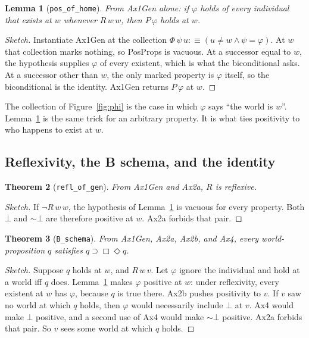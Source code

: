 \documentclass[11pt,a4paper]{article}
\newcommand{\Nec}{\Box}
\newcommand{\Pos}{\Diamond}
\newcommand{\lean}[1]{\texttt{#1}}
\newtheorem{theorem}{Theorem}
\newtheorem{lemma}[theorem]{Lemma}
\theoremstyle{definition}
\theoremstyle{remark}
\begin{document}
\begin{lemma}[\lean{pos\_of\_home}]
\label{lem:home}
From Ax1Gen alone: if \(\varphi\) holds of every individual that exists at
\(w\) whenever \(R\,w\,w\), then \(P\,\varphi\) holds at \(w\).
\end{lemma}

\begin{proof}[Sketch]
Instantiate Ax1Gen at the collection \(\Phi\,\psi\,u :\equiv (u \neq w \land \psi = \varphi)\).
At \(w\) that collection marks nothing, so PosProps is vacuous.
At a successor equal to \(w\), the hypothesis supplies \(\varphi\) of every
existent, which is what the biconditional asks.
At a successor other than \(w\), the only marked property is \(\varphi\) itself,
so the biconditional is the identity.
Ax1Gen returns \(P\,\varphi\) at \(w\).
\end{proof}

The collection of Figure~\ref{fig:phi} is the case in which \(\varphi\) says
``the world is \(w\)''.
Lemma~\ref{lem:home} is the same trick for an arbitrary property.
It is what ties positivity to who happens to exist at \(w\).

\subsection{Reflexivity, the B schema, and the identity}

\begin{theorem}[\lean{refl\_of\_gen}]
\label{thm:refl}
From Ax1Gen and Ax2a, \(R\) is reflexive.
\end{theorem}

\begin{proof}[Sketch]
If \(\neg R\,w\,w\), the hypothesis of Lemma~\ref{lem:home} is vacuous for every
property.
Both \(\bot\) and \(\sim\bot\) are therefore positive at \(w\).
Ax2a forbids that pair.
\end{proof}

\begin{theorem}[\lean{B\_schema}]
\label{thm:B}
From Ax1Gen, Ax2a, Ax2b, and Ax4, every world-proposition \(q\) satisfies
\(q \supset \Nec\Pos q\).
\end{theorem}

\begin{proof}[Sketch]
Suppose \(q\) holds at \(w\), and \(R\,w\,v\).
Let \(\varphi\) ignore the individual and hold at a world iff \(q\) does.
Lemma~\ref{lem:home} makes \(\varphi\) positive at \(w\): under reflexivity,
every existent at \(w\) has \(\varphi\), because \(q\) is true there.
Ax2b pushes positivity to \(v\).
If \(v\) saw no world at which \(q\) holds, then \(\varphi\) would necessarily
include \(\bot\) at \(v\).
Ax4 would make \(\bot\) positive, and a second use of Ax4 would make
\(\sim\bot\) positive.
Ax2a forbids that pair.
So \(v\) sees some world at which \(q\) holds.
\end{proof}
\end{document}
